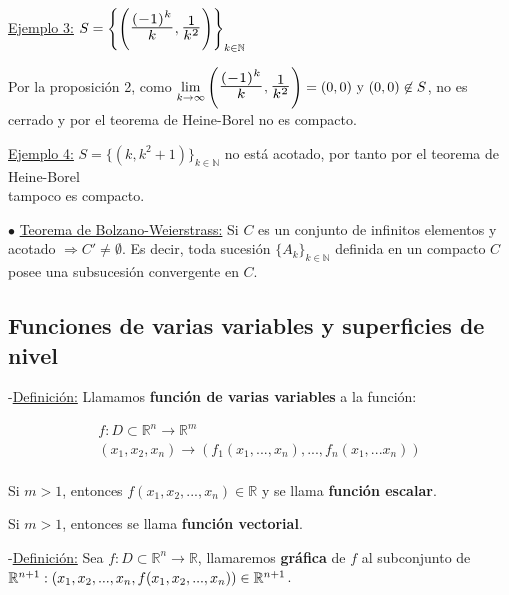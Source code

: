 \documentclass[10pt, titlepage]{article}
\newcommand{\R}{\mathbb{R}}
\newcommand{\N}{\mathbb{N}}
\newcommand{\bfrac}[2]{\scalebox{1.4}{$\frac{#1}{#2}$}}
\newcommand{\definicion}{\noindent-\underline{Definición:} }
\newcommand{\teorema}[1][\!\!]{\noindent$\bullet$ \underline{Teorema #1:} }
\newcommand{\dindent}{\indent\indent}
\begin{document}
\underline{Ejemplo 3:} $S = \left \{ \left ( \bfrac{(-1)^k}{k}, \bfrac{1}{k^2} \right ) \right  \}_{k \in \N}$
\vspace{3mm}

\dindent Por la proposición 2, como $\displaystyle \lim_{k \to \infty} \left ( \bfrac{(-1)^k}{k},
 \bfrac{1}{k^2} \right ) = (0, 0) \text{ y } (0, 0) \not\in S$,  no es  cerrado y por el \dindent teorema de 
Heine-Borel no es compacto.
\vspace{5mm}

\underline{Ejemplo 4:} $S = \{(k, k^2+1)\}_{k \in \N}$ no está acotado, por tanto por el teorema de 
Heine-Borel \\ \indent tampoco es compacto.
\vspace{7mm}


\teorema[de Bolzano-Weierstrass] Si $C$ es un conjunto de infinitos elementos y acotado $\Rightarrow C' 
\neq \emptyset$. Es decir, toda sucesión $\{A_k\}_{k \in \N}$ definida en un compacto $C$ posee una 
subsucesión convergente en $C$.
\vspace{5mm}


\subsection{Funciones de varias variables y superficies de nivel}
\vspace{5mm}

\definicion Llamamos \textbf{función de varias variables} a la función:

\[
\boxed{
\begin{array}{c}

f : D \subset \R^n \to \R^m \\
(x_1, x_2, x_n) \to (f_1(x_1,..., x_n),..., f_n(x_1,...x_n))\\

\end{array}
}
\]
\vspace{3mm}

Si $m > 1$, entonces $f (x_1, x_2,..., x_n) \in \R$ y se llama \textbf{función escalar}.
\vspace{3mm}

Si $m > 1$, entonces se llama \textbf{función vectorial}.
\vspace{7mm}

\definicion Sea $f : D \subset \R^n \to \R$, llamaremos \textbf{gráfica} de $f$ al subconjunto de $\R^
{n+1} : \\ (x_1, x_2,..., x_n, f (x_1, x_2,..., x_n)) \in \R^{n+1}$.
\vspace{5mm}
\end{document}
